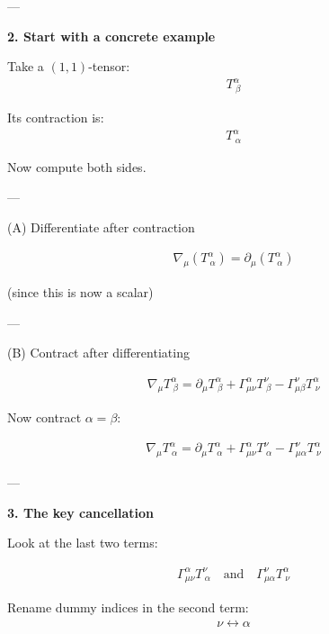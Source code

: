 \documentclass[12pt,a4paper]{report}
\begin{document}
\begin{description}
\begin{description}
---

\item \textbf{2. Start with a concrete example}

Take a $(1,1)$-tensor:
\begin{align*}
T^\alpha_{\ \beta}
\end{align*}

Its contraction is:
\begin{align*}
T^\alpha_{\ \alpha}
\end{align*}

Now compute both sides.

---

\begin{description}
\item (A) Differentiate after contraction

\begin{align*}
\nabla_\mu (T^\alpha_{\ \alpha}) = \partial_\mu (T^\alpha_{\ \alpha})
\end{align*}

(since this is now a scalar)

---

\item (B) Contract after differentiating

\begin{align*}
\nabla_\mu T^\alpha_{\ \beta} = \partial_\mu T^\alpha_{\ \beta} + \Gamma^\alpha_{\mu\nu} T^\nu_{\ \beta} - \Gamma^\nu_{\mu\beta} T^\alpha_{\ \nu}
\end{align*}

Now contract $\alpha = \beta$:

\begin{align*}
\nabla_\mu T^\alpha_{\ \alpha} = \partial_\mu T^\alpha_{\ \alpha} + \Gamma^\alpha_{\mu\nu} T^\nu_{\ \alpha} - \Gamma^\nu_{\mu\alpha} T^\alpha_{\ \nu}
\end{align*}

---
\end{description}

\item \textbf{3. The key cancellation}

Look at the last two terms:

\begin{align*}
\Gamma^\alpha_{\mu\nu} T^\nu_{\ \alpha} \quad \text{and} \quad \Gamma^\nu_{\mu\alpha} T^\alpha_{\ \nu}
\end{align*}

Rename dummy indices in the second term:
\begin{align*}
\nu \leftrightarrow \alpha
\end{align*}


\end{description}
\end{description}
\end{document}
